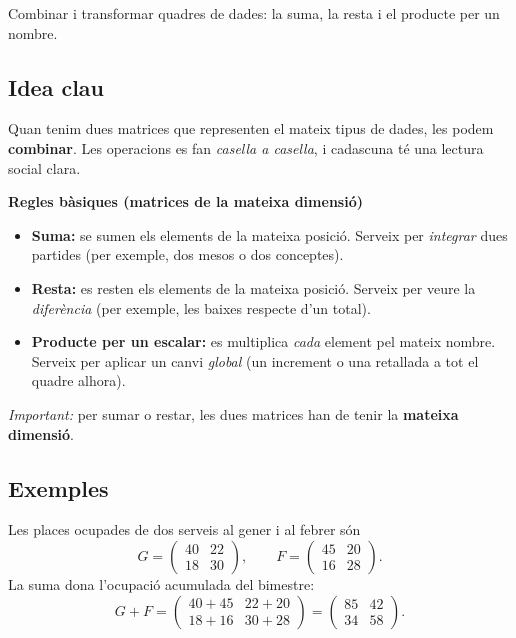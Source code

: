 %
{Combinar i transformar quadres de dades: la suma, la resta i el producte per un nombre.}

\subsection{Idea clau}

Quan tenim dues matrices que representen el mateix tipus de dades, les podem
\textbf{combinar}. Les operacions es fan \emph{casella a casella}, i cadascuna té
una lectura social clara.

\begin{idea}
\textbf{Regles bàsiques (matrices de la mateixa dimensió)}
\begin{itemize}[leftmargin=1.4em, itemsep=2pt]
  \item \textbf{Suma:} se sumen els elements de la mateixa posició. Serveix per
        \emph{integrar} dues partides (per exemple, dos mesos o dos conceptes).
  \item \textbf{Resta:} es resten els elements de la mateixa posició. Serveix per
        veure la \emph{diferència} (per exemple, les baixes respecte d'un total).
  \item \textbf{Producte per un escalar:} es multiplica \emph{cada} element pel
        mateix nombre. Serveix per aplicar un canvi \emph{global} (un increment
        o una retallada a tot el quadre alhora).
\end{itemize}
\textit{Important:} per sumar o restar, les dues matrices han de tenir la
\textbf{mateixa dimensió}.
\end{idea}

\subsection{Exemples}

\begin{exemple}
Les places ocupades de dos serveis al gener i al febrer són
\[
G=\begin{pmatrix} 40 & 22 \\ 18 & 30 \end{pmatrix},\qquad
F=\begin{pmatrix} 45 & 20 \\ 16 & 28 \end{pmatrix}.
\]
La suma dona l'ocupació acumulada del bimestre:
\[
G+F=\begin{pmatrix} 40+45 & 22+20 \\ 18+16 & 30+28 \end{pmatrix}
    =\begin{pmatrix} 85 & 42 \\ 34 & 58 \end{pmatrix}.
\]
\end{exemple}

